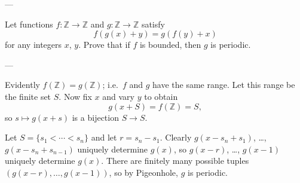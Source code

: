 
---

Let functions $f:\mathbb Z\to\mathbb Z$ and $g:\mathbb Z\to\mathbb Z$ satisfy
\[f(g(x)+y)=g(f(y)+x)\]
for any integers $x$, $y$. Prove that if $f$ is bounded, then $g$ is periodic.

---

Evidently $f(\mathbb Z)=g(\mathbb Z)$; i.e.\ $f$ and $g$ have the same range. Let this range be the finite set $S$. Now fix $x$ and vary $y$ to obtain
\[g(x+S)=f(\mathbb Z)=S,\]
so $s\mapsto g(x+s)$ is a bijection $S\to S$.

Let $S=\{s_1<\cdots<s_n\}$ and let $r=s_n-s_1$. Clearly $g(x-s_n+s_1)$, \ldots, $g(x-s_n+s_{n-1})$ uniquely determine $g(x)$, so $g(x-r)$, \ldots, $g(x-1)$ uniquely determine $g(x)$. There are finitely many possible tuples $(g(x-r),\ldots,g(x-1))$, so by Pigeonhole, $g$ is periodic.
